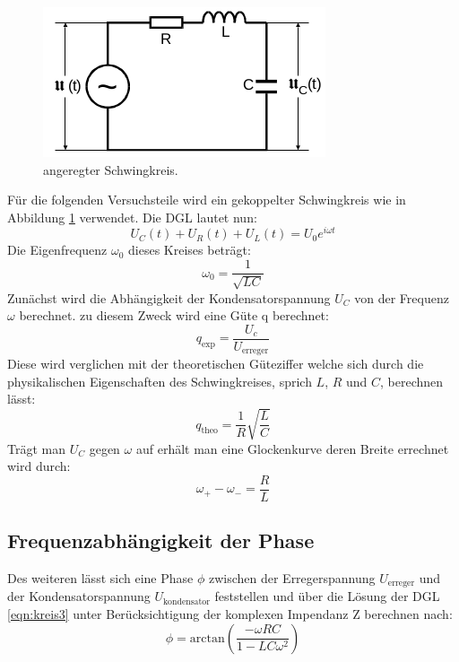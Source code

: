 \begin{figure}[H]
  \centering
  \includegraphics{content/images/kreis2.png}
  \caption{angeregter Schwingkreis.}
  \label{fig:kreis2}
\end{figure}

Für die folgenden Versuchsteile wird ein gekoppelter Schwingkreis
wie in Abbildung \ref{fig:kreis2} verwendet. Die DGL lautet nun:
\begin{equation}
  U_C(t)+U_R(t)+U_L(t)=U_0e^{i\omega t}
  \label{eqn:kreis3}
\end{equation}
Die Eigenfrequenz $\omega_0$ dieses Kreises beträgt:
\begin{equation}
  \omega_0=\frac{1}{\sqrt{LC}}
  \label{eqn:eigen}
\end{equation}
Zunächst wird die Abhängigkeit
der Kondensatorspannung $U_C$ von der Frequenz $\omega$ berechnet.
zu diesem Zweck wird eine Güte q berechnet:
\begin{equation}
  q_\text{exp}=\frac{U_c}{U_\text{erreger}}
  \label{eqn:qexp}
\end{equation}
Diese wird verglichen mit der theoretischen Güteziffer welche sich durch die physikalischen
Eigenschaften des Schwingkreises, sprich $L$, $R$ und $C$, berechnen lässt:
\begin{equation}
  q_\text{theo}=\frac{1}{R}\sqrt{\frac{L}{C}}
    \label{eqn:qtheo}
\end{equation}
Trägt man $U_C$ gegen $\omega$ auf erhält man eine Glockenkurve deren Breite errechnet wird durch:
\begin{equation}
  \omega_+-\omega_-=\frac{R}{L}
  \label{eqn:breite}
\end{equation}

\subsection{Frequenzabhängigkeit der Phase}
Des weiteren lässt sich eine Phase $\phi$ zwischen der Erregerspannung
$U_\text{erreger}$ und der Kondensatorspannung $U_\text{kondensator}$  feststellen und über
die Lösung der DGL \eqref{eqn:kreis3} unter Berücksichtigung der komplexen Impendanz Z berechnen nach:
\begin{equation}
  \phi = \text{arctan}\left(\frac{-\omega RC}{1-LC\omega^2}\right)
  \label{eqn:phase}
\end{equation}
